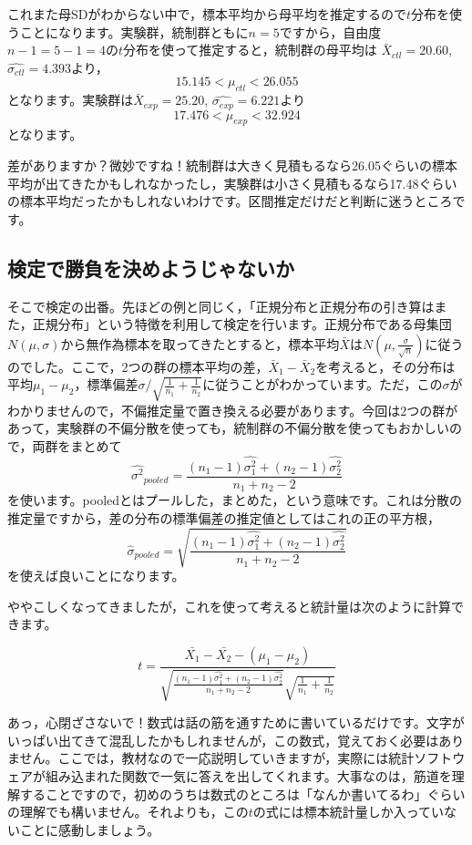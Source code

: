 \documentclass{ltjsarticle}
\begin{document}
これまた母SDがわからない中で，標本平均から母平均を推定するので$t$分布を使うことになります。実験群，統制群ともに$n=5$ですから，自由度$n-1=5-1=4$の$t$分布を使って推定すると，統制群の母平均は
$\bar{X}_{ctl} =20.60$,$\hat{\sigma_{ctl}}=4.393$より，
$$15.145 < \mu_{ctl}<26.055$$
となります。実験群は$\bar{X}_{exp} = 25.20$,
$\hat{\sigma_{exp}}=6.221$より
$$17.476<\mu_{exp}< 32.924$$
となります。

差がありますか？微妙ですね！統制群は大きく見積もるなら26.05ぐらいの標本平均が出てきたかもしれなかったし，実験群は小さく見積もるなら17.48ぐらいの標本平均だったかもしれないわけです。区間推定だけだと判断に迷うところです。
\subsection{検定で勝負を決めようじゃないか}
そこで検定の出番。先ほどの例と同じく，「正規分布と正規分布の引き算はまた，正規分布」という特徴を利用して検定を行います。正規分布である母集団$N(\mu,\sigma)$から無作為標本を取ってきたとすると，標本平均$\bar{X}$は$N(\mu,\frac{\sigma}{\sqrt{n}})$に従うのでした。ここで，2つの群の標本平均の差，$\bar{X}_1 - \bar{X}_2$を考えると，その分布は平均$\mu_1-\mu_2$，標準偏差$\sigma/\sqrt{\frac{1}{n_1}+\frac{1}{n_2}}$に従うことがわかっています。ただ，この$\sigma$がわかりませんので，不偏推定量で置き換える必要があります。今回は2つの群があって，実験群の不偏分散を使っても，統制群の不偏分散を使ってもおかしいので，両群をまとめて
$$ \hat{\sigma^2}_{pooled} = \frac{(n_1-1)\hat{\sigma_1^2}+(n_2-1)\hat{\sigma_2^2}}{n_1+n_2 - 2}$$
を使います。pooledとはプールした，まとめた，という意味です。これは分散の推定量ですから，差の分布の標準偏差の推定値としてはこれの正の平方根，
$$ \hat{\sigma}_{pooled} = \sqrt{\frac{(n_1-1)\hat{\sigma_1^2}+(n_2-1)\hat{\sigma_2^2}}{n_1+n_2 - 2}}$$を使えば良いことになります。

ややこしくなってきましたが，これを使って考えると統計量は次のように計算できます。

$$ t = \frac{\bar{X_1}-\bar{X_2}-(\mu_1-\mu_2)}{\sqrt{\frac{(n_1-1)\hat{\sigma_1^2}+(n_2-1)\hat{\sigma_2^2}}{n_1+n_2 - 2}}\sqrt{\frac{1}{n_1}+\frac{1}{n_2}}}$$

あっ，心閉ざさないで！数式は話の筋を通すために書いているだけです。文字がいっぱい出てきて混乱したかもしれませんが，この数式，覚えておく必要はありません。ここでは，教材なので一応説明していきますが，実際には統計ソフトウェアが組み込まれた関数で一気に答えを出してくれます。大事なのは，筋道を理解することですので，初めのうちは数式のところは「なんか書いてるわ」ぐらいの理解でも構いません。それよりも，この$t$の式には標本統計量しか入っていないことに感動しましょう。
\end{document}
